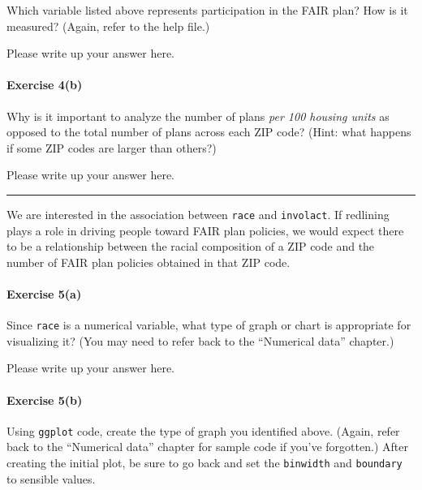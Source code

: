 \documentclass[
]{book}
\begin{document}
Which variable listed above represents participation in the FAIR plan? How is it measured? (Again, refer to the help file.)

Please write up your answer here.

\hypertarget{exercise-4b}{%
\paragraph*{Exercise 4(b)}\label{exercise-4b}}

Why is it important to analyze the number of plans \emph{per 100 housing units} as opposed to the total number of plans across each ZIP code? (Hint: what happens if some ZIP codes are larger than others?)

Please write up your answer here.

\begin{center}\rule{0.5\linewidth}{0.5pt}\end{center}

We are interested in the association between \texttt{race} and \texttt{involact}. If redlining plays a role in driving people toward FAIR plan policies, we would expect there to be a relationship between the racial composition of a ZIP code and the number of FAIR plan policies obtained in that ZIP code.

\hypertarget{exercise-5a}{%
\paragraph*{Exercise 5(a)}\label{exercise-5a}}

Since \texttt{race} is a numerical variable, what type of graph or chart is appropriate for visualizing it? (You may need to refer back to the ``Numerical data'' chapter.)

Please write up your answer here.

\hypertarget{exercise-5b}{%
\paragraph*{Exercise 5(b)}\label{exercise-5b}}

Using \texttt{ggplot} code, create the type of graph you identified above. (Again, refer back to the ``Numerical data'' chapter for sample code if you've forgotten.) After creating the initial plot, be sure to go back and set the \texttt{binwidth} and \texttt{boundary} to sensible values.
\end{document}
